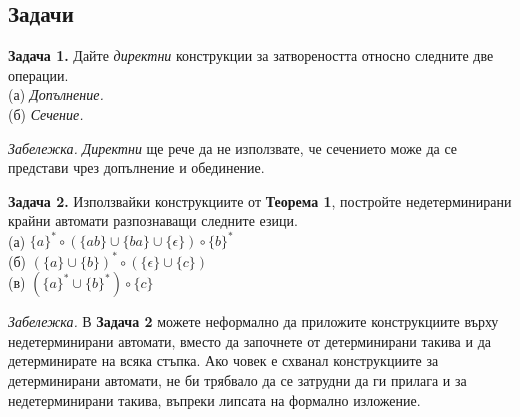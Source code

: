 \documentclass[openany]{book}
\begin{document}
    \subsection{Задачи}
        \textbf{Задача 1.} Дайте \textit{директни} конструкции за затвореността относно
        следните две операции.\\
        (а) \textit{Допълнение.} \\
        (б) \textit{Сечение.} \\
    
        \vspace{10pt}
    
        \textit{Забележка.} \textit{Директни} ще рече да не използвате, че сечението може
        да се представи чрез допълнение и обединение.
    
        \vspace{15pt}
    
        \textbf{Задача 2.} Използвайки конструкциите от \textbf{Теорема 1}, постройте
        недетерминирани крайни автомати разпознаващи следните езици. \\
        (а) $\{a\}^*\circ(\{ab\}\cup\{ba\}\cup\{\epsilon\})\circ\{b\}^*$ \\
        (б) $(\{a\}\cup\{b\})^*\circ(\{\epsilon\}\cup\{c\})$ \\
        (в) $(\{a\}^*\cup\{b\}^*)\circ\{c\}$ 
    
        \vspace{20pt}
    
        \textit{Забележка.} В \textbf{Задача 2} можете неформално да приложите конструкциите върху 
        недетерминирани автомати, вместо да започнете от детерминирани такива и да 
        детерминирате на всяка стъпка. Ако човек е схванал конструкциите за детерминирани
        автомати, не би трябвало да се затрудни да ги прилага и за недетерминирани такива,
        въпреки липсата на формално изложение.
    
        \vspace{15pt}
    
\end{document}

